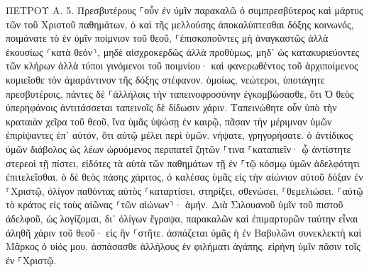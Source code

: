 \documentclass[twoside, 9pt]{extreport}
\begin{document}
ΠΕΤΡΟΥ Α.
5.
Πρεσβυτέρους ⸀οὖν ἐν ὑμῖν παρακαλῶ ὁ συμπρεσβύτερος καὶ μάρτυς τῶν τοῦ Χριστοῦ παθημάτων, ὁ καὶ τῆς μελλούσης ἀποκαλύπτεσθαι δόξης κοινωνός, 
ποιμάνατε τὸ ἐν ὑμῖν ποίμνιον τοῦ θεοῦ, ⸀ἐπισκοποῦντες μὴ ἀναγκαστῶς ἀλλὰ ἑκουσίως ⸂κατὰ θεόν⸃, μηδὲ αἰσχροκερδῶς ἀλλὰ προθύμως, 
μηδ᾽ ὡς κατακυριεύοντες τῶν κλήρων ἀλλὰ τύποι γινόμενοι τοῦ ποιμνίου· 
καὶ φανερωθέντος τοῦ ἀρχιποίμενος κομιεῖσθε τὸν ἀμαράντινον τῆς δόξης στέφανον. 
ὁμοίως, νεώτεροι, ὑποτάγητε πρεσβυτέροις. πάντες δὲ ⸀ἀλλήλοις τὴν ταπεινοφροσύνην ἐγκομβώσασθε, ὅτι Ὁ θεὸς ὑπερηφάνοις ἀντιτάσσεται ταπεινοῖς δὲ δίδωσιν χάριν. 
Ταπεινώθητε οὖν ὑπὸ τὴν κραταιὰν χεῖρα τοῦ θεοῦ, ἵνα ὑμᾶς ὑψώσῃ ἐν καιρῷ, 
πᾶσαν τὴν μέριμναν ὑμῶν ἐπιρίψαντες ἐπ᾽ αὐτόν, ὅτι αὐτῷ μέλει περὶ ὑμῶν. 
νήψατε, γρηγορήσατε. ὁ ἀντίδικος ὑμῶν διάβολος ὡς λέων ὠρυόμενος περιπατεῖ ζητῶν ⸀τινα ⸀καταπιεῖν· 
ᾧ ἀντίστητε στερεοὶ τῇ πίστει, εἰδότες τὰ αὐτὰ τῶν παθημάτων τῇ ἐν ⸀τῷ κόσμῳ ὑμῶν ἀδελφότητι ἐπιτελεῖσθαι. 
ὁ δὲ θεὸς πάσης χάριτος, ὁ καλέσας ὑμᾶς εἰς τὴν αἰώνιον αὐτοῦ δόξαν ἐν ⸀Χριστῷ, ὀλίγον παθόντας αὐτὸς ⸀καταρτίσει, στηρίξει, σθενώσει, ⸀θεμελιώσει. 
⸀αὐτῷ τὸ κράτος εἰς τοὺς αἰῶνας ⸂τῶν αἰώνων⸃· ἀμήν. 
Διὰ Σιλουανοῦ ὑμῖν τοῦ πιστοῦ ἀδελφοῦ, ὡς λογίζομαι, δι᾽ ὀλίγων ἔγραψα, παρακαλῶν καὶ ἐπιμαρτυρῶν ταύτην εἶναι ἀληθῆ χάριν τοῦ θεοῦ· εἰς ἣν ⸀στῆτε. 
ἀσπάζεται ὑμᾶς ἡ ἐν Βαβυλῶνι συνεκλεκτὴ καὶ Μᾶρκος ὁ υἱός μου. 
ἀσπάσασθε ἀλλήλους ἐν φιλήματι ἀγάπης. εἰρήνη ὑμῖν πᾶσιν τοῖς ἐν ⸀Χριστῷ. 
\end{document}
